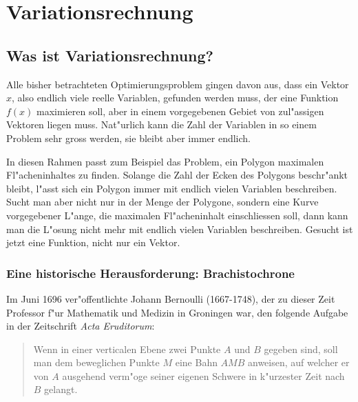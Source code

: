 \chapter{Variationsrechnung\label{chapter-variationsrechnung}}

\section{Was ist Variationsrechnung?}
\rhead{}
Alle bisher betrachteten Optimierungsproblem gingen davon aus, dass
ein Vektor $x$, also endlich viele reelle Variablen, gefunden werden muss,
der eine Funktion $f(x)$ maximieren soll, aber in einem vorgegebenen
Gebiet von zul"assigen Vektoren liegen muss. 
Nat"urlich kann die Zahl der Variablen in so einem Problem sehr gross werden,
sie bleibt aber immer endlich.

In diesen Rahmen passt zum Beispiel das Problem, ein Polygon
maximalen Fl"acheninhaltes zu finden. Solange die Zahl der Ecken
des Polygons beschr"ankt bleibt, l"asst sich ein Polygon immer mit
endlich vielen Variablen beschreiben. Sucht man aber nicht nur in
der Menge der Polygone, sondern eine Kurve vorgegebener L"ange,
die maximalen Fl"acheninhalt einschliessen soll, dann kann man
die L"osung nicht mehr mit endlich vielen Variablen beschreiben.
Gesucht ist jetzt eine Funktion, nicht nur ein Vektor.

\subsection{Eine historische Herausforderung: Brachistochrone}
Im Juni 1696 ver"offentlichte Johann Bernoulli (1667-1748), der
zu dieser Zeit Professor f"ur Mathematik und Medizin in Groningen
war, den folgende Aufgabe in der Zeitschrift {\it Acta Eruditorum}:

\begin{quote}
Wenn in einer verticalen Ebene zwei Punkte $A$ und $B$ gegeben sind,
soll man dem beweglichen Punkte $M$ eine Bahn $AMB$ anweisen, auf welcher
er von $A$ ausgehend verm"oge seiner eigenen Schwere in k"urzester Zeit
nach $B$ gelangt.
\end{quote}

